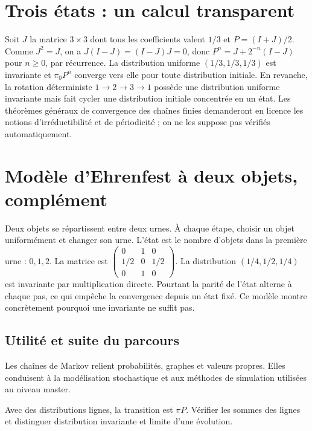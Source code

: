 \documentclass[../cours_tle.tex]{subfiles}
\begin{document}
\section{Trois états : un calcul transparent}
Soit $J$ la matrice $3\times3$ dont tous les coefficients valent $1/3$ et $P=(I+J)/2$.
Comme $J^2=J$, on a $J(I-J)=(I-J)J=0$, donc
$P^n=J+2^{-n}(I-J)$ pour $n\ge0$, par récurrence.
La distribution uniforme $(1/3,1/3,1/3)$ est invariante et $\pi_0P^n$ converge vers elle pour toute distribution initiale.
En revanche, la rotation déterministe $1\to2\to3\to1$ possède une distribution uniforme invariante mais fait cycler une distribution initiale concentrée en un état.
Les théorèmes généraux de convergence des chaînes finies demanderont en licence les notions d'irréductibilité et de périodicité ; on ne les suppose pas vérifiés automatiquement.
\section{Modèle d'Ehrenfest à deux objets, complément}
Deux objets se répartissent entre deux urnes. À chaque étape, choisir un objet uniformément et changer son urne. L'état est le nombre d'objets dans la première urne : $0,1,2$.
La matrice est $\begin{pmatrix}0&1&0\\1/2&0&1/2\\0&1&0\end{pmatrix}$.
La distribution $(1/4,1/2,1/4)$ est invariante par multiplication directe. Pourtant la parité de l'état alterne à chaque pas, ce qui empêche la convergence depuis un état fixé. Ce modèle montre concrètement pourquoi une invariante ne suffit pas.
\begin{finchapitre}
\section{Utilité et suite du parcours}
Les chaînes de Markov relient probabilités, graphes et valeurs propres. Elles conduisent à la modélisation stochastique et aux méthodes de simulation utilisées au niveau master.
\begin{retenir}
Avec des distributions lignes, la transition est $\pi P$. Vérifier les sommes des lignes et distinguer distribution invariante et limite d'une évolution.
\end{retenir}
\end{finchapitre}
\end{document}
